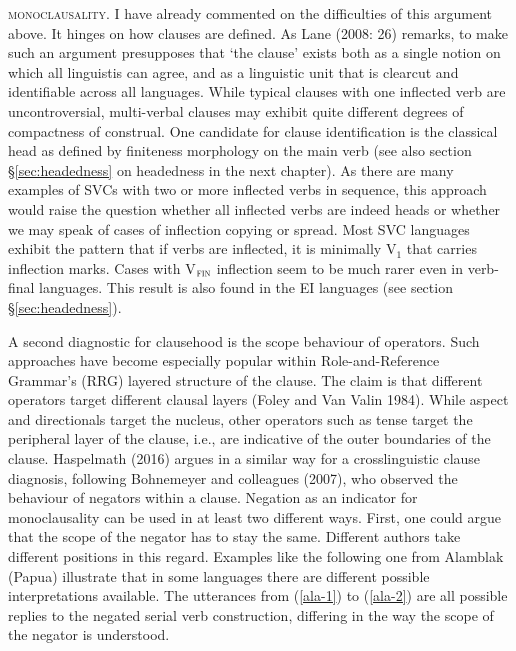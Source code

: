 \textsc{monoclausality}. I have already commented on the difficulties of this argument above. It hinges on how clauses are defined. As Lane (2008: 26) remarks, to make such an argument presupposes that `the clause' exists both as a single notion on which all linguistis can agree, and as a linguistic unit that is clearcut and identifiable across all languages. While typical clauses with one inflected verb are uncontroversial, multi-verbal clauses may exhibit quite different degrees of compactness of construal. One candidate for clause identification is the classical head as defined by finiteness morphology on the main verb (see also section §\ref{sec:headedness} on headedness in the next chapter). As there are many examples of SVCs with two or more inflected verbs in sequence, this approach would raise the question whether all inflected verbs are indeed heads or whether we may speak of cases of inflection copying or spread. Most SVC languages exhibit the pattern that if verbs are inflected, it is minimally V$_1$ that carries inflection marks. Cases with V$_{\textsc{fin}}$ inflection seem to be much rarer even in verb-final languages. This result is also found in the EI languages (see section §\ref{sec:headedness}).

A second diagnostic for clausehood is the scope behaviour of operators. Such approaches have become especially popular within Role-and-Reference Grammar's (RRG) layered structure of the clause. The claim is that different operators target different clausal layers (Foley and Van Valin 1984). While aspect and directionals target the nucleus, other operators such as tense target the peripheral layer of the clause, i.e., are indicative of the outer boundaries of the clause. Haspelmath (2016) argues in a similar way for a crosslinguistic clause diagnosis, following Bohnemeyer and colleagues (2007), who observed the behaviour of negators within a clause. Negation as an indicator for monoclausality can be used in at least two different ways. First, one could argue that the scope of the negator has to stay the same. Different authors take different positions in this regard. Examples like the following one from Alamblak (Papua) illustrate that in some languages there are different possible interpretations available. The utterances from (\ref{ala-1}) to (\ref{ala-2}) are all possible replies to the negated serial verb construction, differing in the way the scope of the negator is understood.

